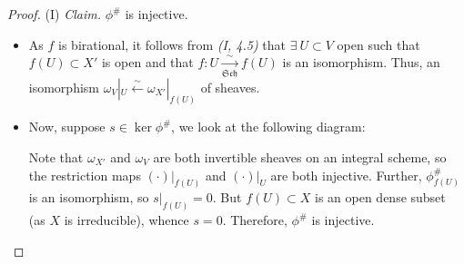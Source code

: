 \documentclass[11pt,a4paper,footinclude=true,headinclude=true]{scrbook} %
\newcommand{\acton}{\rotatebox{180}{$\,\circlearrowright$}}
\newcommand{\Sch}{\mathfrak{Sch}}
\newcommand{\<}{\langle}
\newcommand{\>}{\rangle}
\newcommand\Comm[2][\acton]{%
  \arrow[mysymbol]{#2}[description]{#1}}
\begin{document}
\begin{proof}
    (I) \textit{Claim.} $\phi^\#$ is injective.
    \begin{itemize}
        \item As $f$ is birational, it follows from \textit{(I, 4.5)} that $\exists\ U\subset V$ open such that $f(U)\subset X'$ is open and that $f:U\xrightarrow[\Sch]{\sim}f(U)$ is an isomorphism. Thus, an isomorphism $\omega_V|_U\xleftarrow[]{\sim}\omega_{X'}|_{f(U)}$ of sheaves.
        \item Now, suppose $s\in\ker\phi^\#$, we look at the following diagram:
        \begin{center}
        \end{center}
        Note that $\omega_{X'}$ and $\omega_V$ are both invertible sheaves on an integral scheme, so the restriction maps $(\cdot)|_{f(U)}$ and $(\cdot)|_U$ are both injective. Further, $\phi_{f(U)}^\#$ is an isomorphism, so $s|_{f(U)}=0$. But $f(U)\subset X$ is an open dense subset (as $X$ is irreducible), whence $s=0$. Therefore, $\phi^\#$ is injective.
    \end{itemize}
    

\end{proof}
\end{document}
